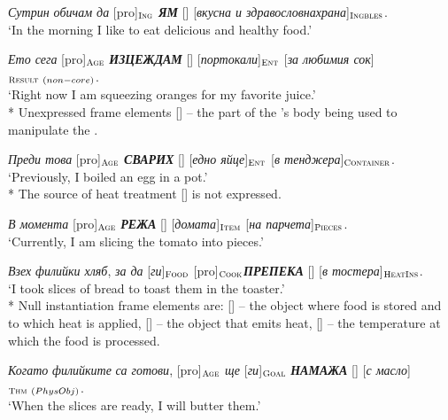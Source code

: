 \documentclass[output=paper,colorlinks,citecolor=brown]{langscibook}
\begin{document}
\begin{exe}  
\ex \label{bg:diff-vb1a} \textit{Сутрин обичам да} [pro]$_{ \text{\textsc{Ing}}}$ \textit{\textbf{ЯМ}} [] [\textit{вкусна и здравословна\linebreak храна}]$_{\text{\textsc{Ingbles}}}$.  \\[-0.8em]
\glt `In the morning I like to eat delicious and healthy food.'

\ex \label{bg:diff-vb1b} \textit{Ето сега} [pro]$_{\text{\textsc{Age}}}$ \textbf{\textit{\uppercase{изцеждам}}} [] [\textit{портокали}]$_{\text{\textsc{Ent}}}$ [\textit{за лю\-бимия сок}]$_{\text{\textsc{Result}}\  (non-core)}$.\\[-0.8em]
\glt `Right now I am squeezing oranges for my favorite juice.' \\
* Unexpressed frame elements [] -- the part of the 's body being used to manipulate the .
 
\ex \label{bg:diff-vb1c}  \textit{Преди това} [pro]$_{\text{\textsc{Age}}}$ \textit{\textbf{\uppercase{сварих}}} [] [\textit{едно яйце}]$_{\text{\textsc{Ent}}}$ [\textit{в тен\-джера}]$_{\text{\textsc{Container}}}$. \\[-0.8em]
\glt `Previously, I boiled  an egg  in a pot.' \\
* The source of heat treatment [] is not expressed.

\ex \label{bg:diff-vb1d} \textit{В момента} [pro]$_{\text{\textsc{Age}}}$ \textit{\textbf{\uppercase{режа}}} [] [\textit{домата}]$_{\text{\textsc{Item}}}$ [\textit{на парчета}]$_{\text{\textsc{Pieces}}}$.  \\[-0.8em]
\glt `Currently, I am slicing the tomato into pieces.'
  
\ex \label{bg:diff-vb1e} \textit{Взех}  \textit{филийки хляб}, \textit{за да} [\textit{ги}]$_{\text{\textsc{Food}}}$ [pro]$_{\text{\textsc{Cook}}}$\textit{\textbf{\uppercase{препека}}} [] [\textit{в тостера}]$_{\text{\textsc{HeatIns}}}$. \\[-0.8em]
\glt `I  took slices of bread to toast them in the toaster.' \\
* Null instantiation frame elements are: [] -- the object where food is stored and to which heat is applied, [] -- the object that emits heat, [] -- the temperature at which the food is processed.

\ex \label{bg:diff-vb1f} \textit{Когато} \textit{филийките} \textit{са готови}, [pro]$_{\text{\textsc{Age}}}$ \textit{ще} [\textit{ги}]$_{\text{\textsc{Goal}}}$ \textit{\textbf{\uppercase{намажа}}} [] [\textit{с масло}]$_{\text{\textsc{Thm}}\  (PhysObj)}$.\\[-0.8em]
\glt `When the slices are ready, I will butter them.'


\end{exe}
\end{document}
